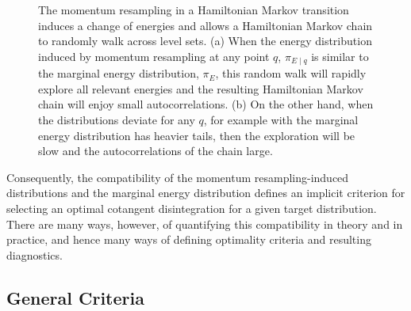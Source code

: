 \documentclass[stslayout]{imsart}
\begin{document}
\begin{figure}
\centering
{}
\caption{The momentum resampling in a Hamiltonian Markov transition
induces a change of energies and allows a Hamiltonian Markov chain to 
randomly walk across level sets.  (a) When the energy distribution induced
by momentum resampling at any point $q$, $\pi_{E \mid q}$ is similar to the 
marginal energy distribution, $\pi_{E}$, this random walk will rapidly explore 
all relevant energies and the resulting Hamiltonian Markov chain will enjoy
small autocorrelations.  (b) On the other hand, when the distributions
deviate for any $q$, for example with the marginal energy distribution has 
heavier tails, then the exploration will be slow and the autocorrelations of 
the chain large.}
\label{fig:energy_marginals}
\end{figure}

Consequently, the compatibility of the momentum resampling-induced 
distributions and the marginal energy distribution defines an implicit criterion 
for selecting an optimal cotangent disintegration for a given target distribution.  
There are many ways, however, of quantifying this compatibility in theory and 
in practice, and hence many ways of defining optimality criteria and resulting
diagnostics.

\subsection{General Criteria}
\end{document}
